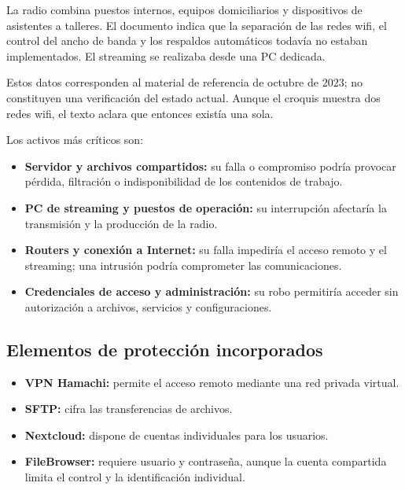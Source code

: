 \documentclass[12pt,a4paper]{article}
\begin{document}
La radio combina puestos internos, equipos domiciliarios y dispositivos de asistentes a talleres. El documento indica que la separación de las redes wifi, el control del ancho de banda y los respaldos automáticos todavía no estaban implementados. El streaming se realizaba desde una PC dedicada.

Estos datos corresponden al material de referencia de octubre de 2023; no constituyen una verificación del estado actual. Aunque el croquis muestra dos redes wifi, el texto aclara que entonces existía una sola.

Los activos más críticos son:
\begin{itemize}
    \item \textbf{Servidor y archivos compartidos:} su falla o compromiso podría provocar pérdida, filtración o indisponibilidad de los contenidos de trabajo.
    \item \textbf{PC de streaming y puestos de operación:} su interrupción afectaría la transmisión y la producción de la radio.
    \item \textbf{Routers y conexión a Internet:} su falla impediría el acceso remoto y el streaming; una intrusión podría comprometer las comunicaciones.
    \item \textbf{Credenciales de acceso y administración:} su robo permitiría acceder sin autorización a archivos, servicios y configuraciones.
\end{itemize}

\newpage
\subsection*{Elementos de protección incorporados}
\begin{itemize}
    \item \textbf{VPN Hamachi:} permite el acceso remoto mediante una red privada virtual.
    \item \textbf{SFTP:} cifra las transferencias de archivos.
    \item \textbf{Nextcloud:} dispone de cuentas individuales para los usuarios.
    \item \textbf{FileBrowser:} requiere usuario y contraseña, aunque la cuenta compartida limita el control y la identificación individual.
\end{itemize}
\end{document}
